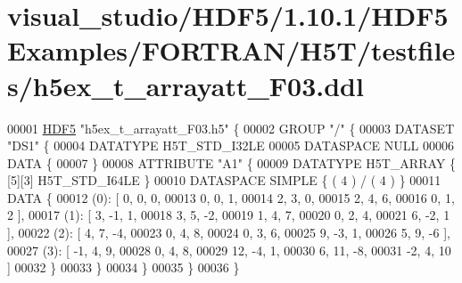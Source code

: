 \hypertarget{visual__studio_2_h_d_f5_21_810_81_2_h_d_f5_examples_2_f_o_r_t_r_a_n_2_h5_t_2testfiles_2h5ex__t__arrayatt___f03_8ddl_source}{}\section{visual\+\_\+studio/\+H\+D\+F5/1.10.1/\+H\+D\+F5\+Examples/\+F\+O\+R\+T\+R\+A\+N/\+H5\+T/testfiles/h5ex\+\_\+t\+\_\+arrayatt\+\_\+\+F03.ddl}
\label{visual__studio_2_h_d_f5_21_810_81_2_h_d_f5_examples_2_f_o_r_t_r_a_n_2_h5_t_2testfiles_2h5ex__t__arrayatt___f03_8ddl_source}

\begin{DoxyCode}
00001 \hyperlink{namespace_h_d_f5}{HDF5} \textcolor{stringliteral}{"h5ex\_t\_arrayatt\_F03.h5"} \{
00002 GROUP \textcolor{stringliteral}{"/"} \{
00003    DATASET \textcolor{stringliteral}{"DS1"} \{
00004       DATATYPE  H5T\_STD\_I32LE
00005       DATASPACE  NULL
00006       DATA \{
00007       \}
00008       ATTRIBUTE \textcolor{stringliteral}{"A1"} \{
00009          DATATYPE  H5T\_ARRAY \{ [5][3] H5T\_STD\_I64LE \}
00010          DATASPACE  SIMPLE \{ ( 4 ) / ( 4 ) \}
00011          DATA \{
00012          (0): [ 0, 0, 0,
00013                0, 0, 1,
00014                2, 3, 0,
00015                2, 4, 6,
00016                0, 1, 2 ],
00017          (1): [ 3, -1, 1,
00018                3, 5, -2,
00019                1, 4, 7,
00020                0, 2, 4,
00021                6, -2, 1 ],
00022          (2): [ 4, 7, -4,
00023                0, 4, 8,
00024                0, 3, 6,
00025                9, -3, 1,
00026                5, 9, -6 ],
00027          (3): [ -1, 4, 9,
00028                0, 4, 8,
00029                12, -4, 1,
00030                6, 11, -8,
00031                -2, 4, 10 ]
00032          \}
00033       \}
00034    \}
00035 \}
00036 \}
\end{DoxyCode}
